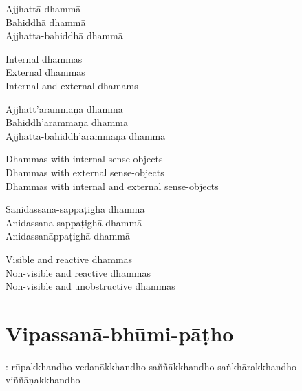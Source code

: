 \begin{pali-hang-continued}
Ajjhattā dhammā\\
Bahiddhā dhammā\\
Ajjhatta-bahiddhā dhammā
\end{pali-hang-continued}

\begin{english-verses}
  Internal dhammas\\
  External dhammas\\
  Internal and external dhamams
\end{english-verses}

\begin{pali-hang-continued}
Ajjhatt'ārammaṇā dhammā\\
Bahiddh'ārammaṇā dhammā\\
Ajjhatta-bahiddh'ārammaṇā dhammā
\end{pali-hang-continued}

\begin{english-verses}
  Dhammas with internal sense-objects\\
  Dhammas with external sense-objects\\
  Dhammas with internal and external sense-objects
\end{english-verses}

\begin{pali-hang-continued}
Sanidassana-sappaṭighā dhammā\\
Anidassana-sappaṭighā dhammā\\
Anidassanāppaṭighā dhammā
\end{pali-hang-continued}

\begin{english-verses}
  Visible and reactive dhammas\\
  Non-visible and reactive dhammas\\
  Non-visible and unobstructive dhammas
\end{english-verses}

\suttaRef{[Dhs 1]}

\section{Vipassanā-bhūmi-pāṭho}
\label{vipassana-bhumi-patho}

\vspace{-0.8em}

\begin{pali-hang}
[Pañcakkhandhā]: rūpakkhandho vedanākkhandho saññākkhandho saṅkhārakkhandho viññāṇakkhandho
\end{pali-hang}

